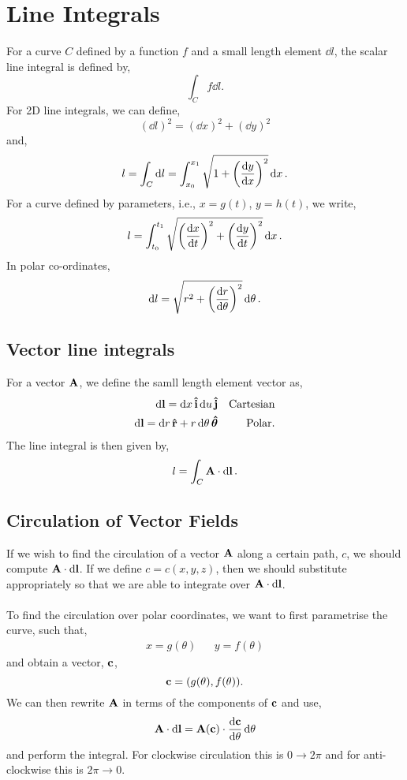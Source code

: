 \documentclass{book}
\begin{document}
\section{Line Integrals}
For a curve $C$ defined by a function $f$ and a small length element $\dd{l}$, the scalar line integral is defined by,
\begin{equation}
	\int_C f\dd{l}.
\end{equation}
For 2D line integrals, we can define,
\begin{equation}
	(\dd{l})^2 = (\dd{x})^2 + (\dd{y})^2
\end{equation}
and,
\begin{equation}
	l = \int_C \dd{l} = \int_{x_0}^{x_1} \sqrt{1 + \left(\dv{y}{x}\right)^2}\dd{x}.
\end{equation}
For a curve defined by parameters, i.e., $x = g(t)$, $y = h(t)$, we write,
\begin{equation}
	l = \int_{t_0}^{t_1}\sqrt{\left(\dv{x}{t}\right)^2 + \left(\dv{y}{t}\right)^2}\dd{x}.
\end{equation}
In polar co-ordinates,
\begin{equation}
	\dd{l} = \sqrt{r^2 + \left(\dv{r}{\theta}\right)^2}\dd{\theta}.
\end{equation}
\subsection{Vector line integrals}
For a vector $\vb{A}$, we define the samll length element vector as,
\begin{align}
	\dd{\vb{l}} = \dd{x}\vu{i} \dd{u}\vu{j} && \text{Cartesian} \\
	\dd{\vb{l}} = \dd{r}\vu{r} + r\dd{\theta}\vu*{\theta} && \text{Polar}.
\end{align}
The line integral is then given by,
\begin{equation}
	l = \int_C \vb{A} \cdot \dd{\vb{l}}.
\end{equation}
\subsection{Circulation of Vector Fields}
If we wish to find the circulation of a vector $\vb{A}$ along a certain path, $c$, we should compute $\vb{A}\cdot\dd{\vb{l}}$. If we define $c = c(x,y,z)$, then we should substitute appropriately so that we are able to integrate over $\vb{A}\cdot\dd{\vb{l}}$.
\\\\
To find the circulation over polar coordinates, we want to first parametrise the curve, such that,
\begin{align}
	x = g(\theta) && y = f(\theta)
\end{align}
and obtain a vector, $\vb{c}$,
\begin{equation}
	\vb{c} = (g(\theta),f(\theta)).
\end{equation}
We can then rewrite $\vb{A}$ in terms of the components of $\vb{c}$ and use,
\begin{equation}
	\vb{A}\cdot\dd{\vb{l}} = \vb{A}(\vb{c}) \cdot \dv{\vb{c}}{\theta}\dd{\theta}
\end{equation}
and perform the integral. For clockwise circulation this is $0 \to 2\pi$ and for anti-clockwise this is $2\pi \to 0$.
\end{document}
